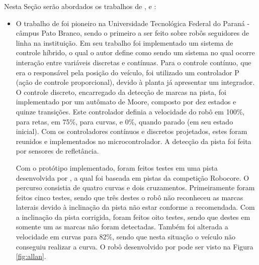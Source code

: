 Nesta Seção serão abordados os trabalhos de \cite{allan}, \cite{alemao} e \cite{Hirai}:

\begin{itemize}

\item O trabalho de  foi pioneiro na Universidade Tecnológica Federal do Paraná - câmpus Pato Branco, sendo o 
primeiro a ser feito sobre robôs seguidores de linha na instituição. 
Em seu trabalho foi implementado um sistema de controle híbrido, o qual o autor define como sendo um sistema no qual ocorre interação 
entre variáveis discretas e contínuas. Para o controle contínuo, que era o responsável pela posição do veículo, 
foi utilizado um controlador P (ação de controle proporcional), 
devido à planta já apresentar um integrador. O controle discreto, encarregado da detecção de marcas na pista, 
foi implementado por um autômato de Moore, composto por dez estados e quinze transições. Este controlador definia a velocidade do 
robô em 100\%, para retas, em 75\%, para curvas, e 0\%, quando parado (em seu estado inicial).
Com os controladores contínuos e discretos 
projetados, estes foram reunidos e implementados no microcontrolador. A detecção da pista foi feita por sensores de 
refletância.\par
Com o protótipo implementado, foram feitos testes em uma pista desenvolvida por , a qual foi baseada em pistas da 
competição Robocore. O percurso consistia de quatro curvas e dois cruzamentos. Primeiramente foram feitos cinco testes, sendo que 
três destes o robô não reconheceu as marcas laterais devido à inclinação da pista não estar conforme a recomendada. Com a 
inclinação da pista corrigida, foram feitos oito testes, sendo que destes em somente um as marcas não foram detectadas. Também foi 
alterada a velocidade em curvas para 82\%, sendo que nesta situação o veículo não conseguiu realizar a curva. 
O robô desenvolvido por  pode ser visto na Figura \ref{fig:allan}.


\end{itemize}
